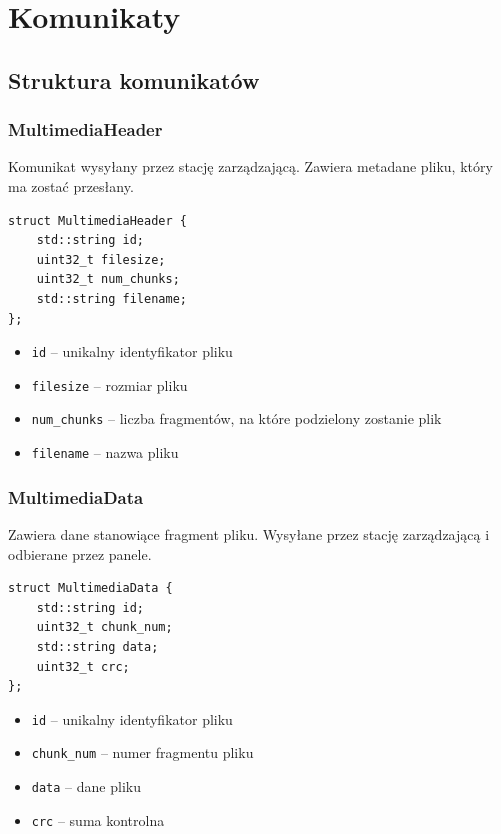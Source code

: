 \documentclass[12pt, a4paper]{article}
\providecommand{\tightlist}{%
  \setlength{\itemsep}{0pt}\setlength{\parskip}{0pt}}
\begin{document}
\hypertarget{komunikaty}{%
\section{Komunikaty}\label{komunikaty}}

\hypertarget{struktura-komunikatow}{%
\subsection{Struktura komunikatów}\label{struktura-komunikatow}}

\hypertarget{multimedia-header}{%
\subsubsection{MultimediaHeader}\label{multimedia-header}}

Komunikat wysyłany przez stację zarządzającą. Zawiera metadane pliku, który ma zostać przesłany.

\begin{verbatim}
struct MultimediaHeader {
    std::string id;
    uint32_t filesize;
    uint32_t num_chunks;
    std::string filename;
};
\end{verbatim}

\begin{itemize}
\tightlist
    \item \texttt{id} -- unikalny identyfikator pliku
    \item \texttt{filesize} -- rozmiar pliku
    \item \texttt{num\_chunks} -- liczba fragmentów, na które podzielony zostanie plik 
    \item \texttt{filename} -- nazwa pliku
\end{itemize}

\hypertarget{multimedia-data}{%
\subsubsection{MultimediaData}\label{multimedia-data}}

Zawiera dane stanowiące fragment pliku. Wysyłane przez stację zarządzającą i odbierane przez panele.

\begin{verbatim}
struct MultimediaData {
    std::string id;
    uint32_t chunk_num;
    std::string data;
    uint32_t crc;
};
\end{verbatim}

\begin{itemize}
\tightlist
    \item \texttt{id} -- unikalny identyfikator pliku
    \item \texttt{chunk\_num} -- numer fragmentu pliku
    \item \texttt{data} -- dane pliku 
    \item \texttt{crc} -- suma kontrolna
\end{itemize}
\end{document}
